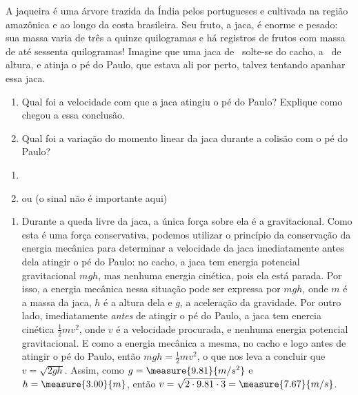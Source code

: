 \begin{question}
	\newcommand\HEIGHT{\measure{3.00}{m}}
	\newcommand\MASS{\measure{5.00}{kg}}
	\newcommand\FORCE{\measure{256}{N}}
	\newcommand\DURATION{\measure{0,150}{s}}
	\newcommand\GRAVITY{\measure{9.81}{m/s^2}}

	A jaqueira é uma árvore trazida da Índia pelos portugueses e cultivada na região amazônica e ao longo da costa brasileira.
	Seu fruto, a jaca, é enorme e pesado: sua massa varia de três a quinze quilogramas e há registros de frutos com massa de até sessenta quilogramas!
	Imagine que uma jaca de \MASS\ solte-se do cacho, a \HEIGHT\ de altura, e atinja o pé do Paulo, que estava ali por perto, talvez tentando apanhar essa jaca.
	\begin{enumerate}
		\item Qual foi a velocidade com que a jaca atingiu o pé do Paulo?
		Explique como chegou a essa conclusão.
		\item Qual foi a variação do momento linear da jaca durante a colisão com o pé do Paulo?
	\end{enumerate}

	\begin{answer}
		\begin{enumerate}
			\item {}
			\item {} ou  (o sinal não é importante aqui)
		\end{enumerate}
	\end{answer}

	\begin{solution}
		\begin{enumerate}
			\item Durante a queda livre da jaca, a única força sobre ela é a gravitacional.
			Como esta é uma força conservativa, podemos utilizar o princípio da conservação da energia mecânica para determinar a velocidade da jaca imediatamente antes dela atingir o pé do Paulo: no cacho, a jaca tem energia potencial gravitacional $mgh$, mas nenhuma energia cinética, pois ela está parada.
			Por isso, a energia mecânica nessa situação pode ser expressa por $mgh$, onde $m$ é a massa da jaca, $h$ é a altura dela e $g$, a aceleração da gravidade.
			Por outro lado, imediatamente \emph{antes} de atingir o pé do Paulo, a jaca tem enercia cinética $\frac{1}{2}mv^2$, onde $v$ é a velocidade procurada, e nenhuma energia potencial gravitacional.
			E como a energia mecânica a mesma, no cacho e logo antes de atingir o pé do Paulo, então $mgh = \frac{1}{2}mv^2$, o que nos leva a concluir que $v = \sqrt{2gh}$.
			Assim, como $g = \GRAVITY$ e $h = \HEIGHT$, então $v = \sqrt{2 \cdot 9.81 \cdot 3} = \measure{7.67}{m/s}$.


\end{enumerate}
\end{solution}
\end{question}
